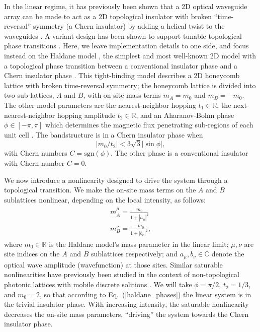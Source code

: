 \documentclass[aps,prx,twocolumn,superscriptaddress]{revtex4-1}
\begin{document}
In the linear regime, it has previously been shown that a 2D optical waveguide array can be made to act as a 2D topological insulator with broken ``time-reversal'' symmetry (a Chern insulator) by adding a helical twist to the waveguides \cite{rechtsman2013nature}.  A variant design has been shown to support tunable topological phase transitions \cite{leykam2016a}.  Here, we leave implementation details to one side, and focus instead on the Haldane model \cite{Haldane1988}, the simplest and most well-known 2D model with a topological phase transition between a conventional insulator phase and a Chern insulator phase \cite{Haldane1988}.  This tight-binding model describes a 2D honeycomb lattice with broken time-reversal symmetry; the honeycomb lattice is divided into two sub-lattices, $A$ and $B$, with on-site mass terms $m_A = m_0$ and $m_B = -m_0$.  The other model parameters are the nearest-neighbor hopping $t_1 \in \mathbb{R}$, the next-nearest-neighbor hopping amplitude $t_2 \in \mathbb{R}$, and an Aharanov-Bohm phase $\phi \in [-\pi,\pi]$ which determines the magnetic flux penetrating sub-regions of each unit cell \cite{Haldane1988}.  The bandstructure is in a Chern insulator phase when
\begin{equation}
  \left| m_0/t_2 \right| < 3\sqrt{3} \left|\sin\phi\right|,
  \label{haldane_phases}
\end{equation}
with Chern numbers $C = \mathrm{sgn}(\phi)$.  The other phase is a conventional insulator with Chern number $C = 0$.

We now introduce a nonlinearity designed to drive the system through a topological transition.  We make the on-site mass terms on the $A$ and $B$ sublattices nonlinear, depending on the local intensity, as follows:
\begin{align}
  \begin{aligned}
  m_A^\mu = \frac{m_0}{1+|a_\mu|^2}\\
  m_B^\nu = \frac{-m_0}{1+|b_\nu|^2},
  \end{aligned}
  \label{haldane_nonlinearity}
\end{align}
where $m_0 \in \mathbb{R}$ is the Haldane model's mass parameter in the linear limit; $\mu,\nu$ are site indices on the $A$ and $B$ sublattices respectively; and $a_\mu, b_\nu \in \mathbb{C}$ denote the optical wave amplitude (wavefunction) at those sites.  Similar saturable nonlinearities have previously been studied in the context of non-topological photonic lattices with mobile discrete solitions \cite{Melvin2006}.  We will take $\phi = \pi/2$, $t_2 = 1/3$, and $m_0 = 2$, so that according to Eq.~(\ref{haldane_phases}) the linear system is in the trivial insulator phase.  With increasing intensity, the saturable nonlinearity decreases the on-site mass parameters, ``driving'' the system towards the Chern insulator phase.
\end{document}
